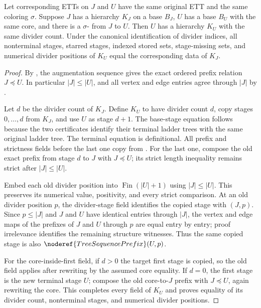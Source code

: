 \begin{helper}
Let corresponding ETTs on $J$ and $U$ have the same original ETT and the
same coloring $\sigma$.  Suppose $J$ has a hierarchy $K_J$ on a base
$B_J$, $U$ has a base $B_U$ with the same core, and there is a
$\sigma$- from $J$ to $U$.
Then $U$ has a hierarchy $K_U$ with the same divider count.  Under the
canonical identification of divider indices, all nonterminal stages,
starred stages, indexed stored sets, stage-missing sets, and numerical
divider positions of $K_U$ equal the corresponding data of $K_J$.
\end{helper}
\begin{proof}
By , the augmentation
sequence gives the exact ordered prefix relation $J\preccurlyeq U$.
In particular $|J|\leq |U|$, and all vertex and edge entries agree through
$|J|$ by .

Let $d$ be the divider count of $K_J$.  Define $K_U$ to have divider count
$d$, copy stages $0,\ldots,d$ from $K_J$, and use $U$ as stage $d+1$.
The base-stage equation follows because the two
 certificates identify their
terminal ladder trees with the same original ladder tree.  The terminal
equation is definitional.  All prefix and strictness fields before the
last one copy from .  For the last one,
compose the old exact prefix from stage $d$ to $J$ with
$J\preccurlyeq U$; its strict length inequality remains strict after
$|J|\leq|U|$.

Embed each old divider position into $\operatorname{Fin}(|U|+1)$ using
$|J|\leq|U|$.  This preserves its numerical value, positivity, and every
strict comparison.  At an old divider position $p$, the divider-stage
field identifies the copied stage with
$(J,p)$.  Since $p\leq|J|$ and $J$ and $U$
have identical entries through $|J|$, the vertex and edge maps of the
prefixes of $J$ and $U$ through $p$ are equal entry by entry; proof
irrelevance identifies the remaining structure witnesses.  Thus the
same copied stage is also $\noderef{TreeSequencePrefix}(U,p)$.

For the core-inside-first field, if $d>0$ the target first stage is copied,
so the old field applies after rewriting by the assumed core equality.  If
$d=0$, the first stage is the new terminal stage $U$; compose the old
core-to-$J$ prefix with $J\preccurlyeq U$, again rewriting the core.
This completes every field of $K_U$ and proves equality of its divider
count, nonterminal stages, and numerical divider positions.


\end{proof}
